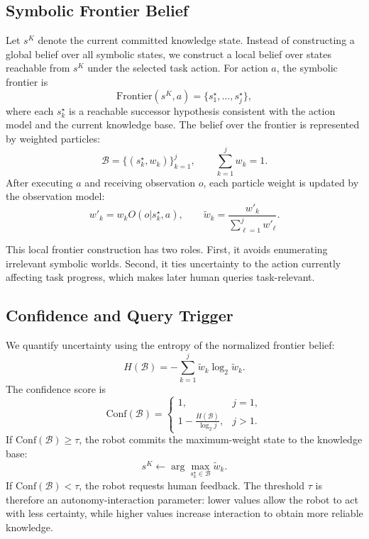 \subsection{Symbolic Frontier Belief}

Let $s^K$ denote the current committed knowledge state. Instead of constructing a global belief over all symbolic states, we construct a local belief over states reachable from $s^K$ under the selected task action. For action $a$, the symbolic frontier is
\begin{equation}
\mathrm{Frontier}(s^K,a)=\{s_1^\star,\ldots,s_j^\star\},
\label{eq:frontier}
\end{equation}
where each $s_k^\star$ is a reachable successor hypothesis consistent with the action model and the current knowledge base. The belief over the frontier is represented by weighted particles:
\begin{equation}
\mathcal{B}=\{(s_k^\star,w_k)\}_{k=1}^{j}, \qquad \sum_{k=1}^{j}w_k=1.
\label{eq:belief_particles}
\end{equation}
After executing $a$ and receiving observation $o$, each particle weight is updated by the observation model:
\begin{equation}
w'_k = w_k O(o|s_k^\star,a), \qquad
\tilde{w}_k = \frac{w'_k}{\sum_{\ell=1}^{j}w'_\ell}.
\label{eq:frontier_update}
\end{equation}

This local frontier construction has two roles. First, it avoids enumerating irrelevant symbolic worlds. Second, it ties uncertainty to the action currently affecting task progress, which makes later human queries task-relevant.

\subsection{Confidence and Query Trigger}

We quantify uncertainty using the entropy of the normalized frontier belief:
\begin{equation}
H(\mathcal{B})=-\sum_{k=1}^{j}\tilde{w}_k\log_2 \tilde{w}_k.
\label{eq:entropy}
\end{equation}
The confidence score is
\begin{equation}
\mathrm{Conf}(\mathcal{B})=
\begin{cases}
1, & j=1,\\
1-\frac{H(\mathcal{B})}{\log_2 j}, & j>1.
\end{cases}
\label{eq:confidence}
\end{equation}
If $\mathrm{Conf}(\mathcal{B})\geq \tau$, the robot commits the maximum-weight state to the knowledge base:
\begin{equation}
s^K \leftarrow \arg\max_{s_k^\star \in \mathcal{B}}\tilde{w}_k.
\label{eq:commit}
\end{equation}
If $\mathrm{Conf}(\mathcal{B})<\tau$, the robot requests human feedback. The threshold $\tau$ is therefore an autonomy-interaction parameter: lower values allow the robot to act with less certainty, while higher values increase interaction to obtain more reliable knowledge.

